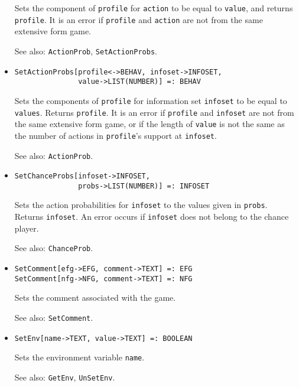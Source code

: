 \begin{itemize}
\bd
Sets the component of \verb+profile+ for
\verb+action+ to be equal to \verb+value+, and 
returns \verb+profile+.  It is an error if \verb+profile+ and \verb+action+
are not from the same extensive form game. 
\item [See also:] \verb+ActionProb+, \verb+SetActionProbs+.
\ed

\item{}
\protect \large \begin{verbatim} 
SetActionProbs[profile<->BEHAV, infoset->INFOSET, 
               value->LIST(NUMBER)] =: BEHAV 
\end{verbatim}\normalsize

\bd
Sets the components of \verb+profile+ for
information set \verb+infoset+ to be equal to \verb+values+.
Returns \verb+profile+.  It is an error if \verb+profile+ and \verb+infoset+
are not from the same extensive form game, or if the length of
\verb+value+ is not the same as the number of actions in \verb+profile+'s
support at \verb+infoset+.
\item [See also:] \verb+ActionProb+.
\ed

\item{}
\protect \large \begin{verbatim} 
SetChanceProbs[infoset->INFOSET, 
               probs->LIST(NUMBER)] =: INFOSET 
\end{verbatim}\normalsize

\bd
Sets the action probabilities for 
\verb+infoset+ to the values given in \verb+probs+.  Returns \verb+infoset+. 
An error occurs if \verb+infoset+ does not belong to the chance player.
\item [See also:] \verb+ChanceProb+.
\ed

\item{}
\protect \large \begin{verbatim}
SetComment[efg->EFG, comment->TEXT] =: EFG
SetComment[nfg->NFG, comment->TEXT] =: NFG
\end{verbatim} \normalsize

\bd
Sets the comment associated with the game.
\item [See also:] \verb+SetComment+.
\ed

\item{}
\protect \large \begin{verbatim}
SetEnv[name->TEXT, value->TEXT] =: BOOLEAN 
\end{verbatim} \normalsize

\bd
Sets the environment variable \verb+name+.
\item [See also:] \verb+GetEnv+, \verb+UnSetEnv+.
\ed


\end{itemize}
